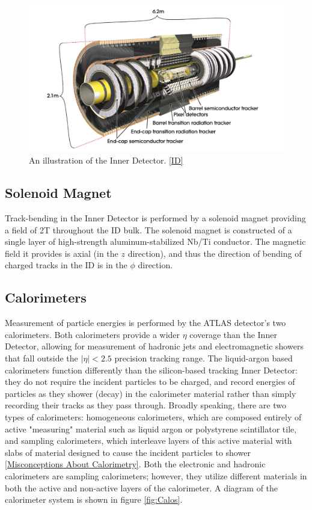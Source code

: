 \begin{figure}
  \includegraphics[width=\linewidth]{figures/detector_chapter/ID.png}
  \caption{An illustration of the Inner Detector. \ref{ID}}
  \label{fig:ID}
\end{figure}

\subsection{Solenoid Magnet} \label{sec:solenoid}

Track-bending in the Inner Detector is performed by a solenoid magnet providing a field of 2T throughout the ID bulk. The solenoid magnet is constructed of a single layer of high-strength aluminum-stabilized Nb/Ti conductor. The magnetic field it provides is axial (in the $z$ direction), and thus the direction of bending of charged tracks in the ID is in the $\phi$ direction. 

\subsection{Calorimeters} \label{sec:Calos} 

Measurement of particle energies is performed by the ATLAS detector's two calorimeters. Both calorimeters provide a wider $\eta$ coverage than the Inner Detector, allowing for measurement of hadronic jets and electromagnetic showers that fall outside the $|\eta| < 2.5$ precision tracking range. The liquid-argon based calorimeters function differently than the silicon-based tracking Inner Detector: they do not require the incident particles to be charged, and record energies of particles as they shower (decay) in the calorimeter material rather than simply recording their tracks as they pass through. Broadly speaking, there are two types of calorimeters: homogeneous calorimeters, which are composed entirely of active "measuring" material such as liquid argon or polystyrene scintillator tile, and sampling calorimeters, which interleave layers of this active material with slabs of material designed to cause the incident particles to shower \ref{Misconceptions About Calorimetry}. Both the electronic and hadronic calorimeters are sampling calorimeters; however, they utilize different materials in both the active and non-active layers of the calorimeter. A diagram of the calorimeter system is shown in figure \ref{fig:Calos}.

